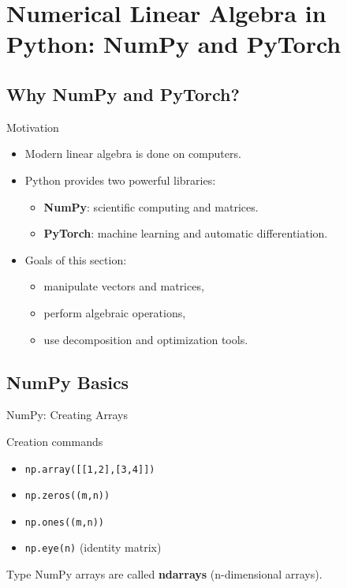 \documentclass[aspectratio=169]{beamer}
\begin{document}
\section{Numerical Linear Algebra in Python: NumPy and PyTorch}

\subsection{Why NumPy and PyTorch?}

\begin{frame}{Motivation}

\begin{itemize}
    \item Modern linear algebra is done on computers.
    \item Python provides two powerful libraries:
    \begin{itemize}
        \item \textbf{NumPy}: scientific computing and matrices.
        \item \textbf{PyTorch}: machine learning and automatic differentiation.
    \end{itemize}

    \pause

    \item Goals of this section:
    \begin{itemize}
        \item manipulate vectors and matrices,
        \item perform algebraic operations,
        \item use decomposition and optimization tools.
    \end{itemize}
\end{itemize}

\end{frame}

\subsection{NumPy Basics}

\begin{frame}{NumPy: Creating Arrays}

\begin{block}{Creation commands}
\begin{itemize}
    \item \texttt{np.array([[1,2],[3,4]])}
    \item \texttt{np.zeros((m,n))}
    \item \texttt{np.ones((m,n))}
    \item \texttt{np.eye(n)} (identity matrix)
\end{itemize}
\end{block}

\pause

\begin{alertblock}{Type}
NumPy arrays are called \textbf{ndarrays} (n-dimensional arrays).
\end{alertblock}

\end{frame}
\end{document}
